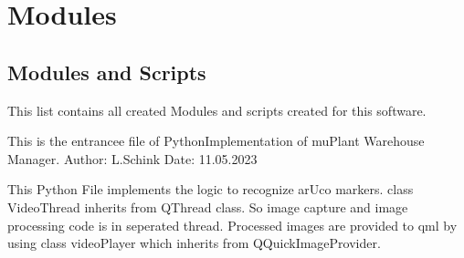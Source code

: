 \documentclass[letterpaper,10pt,english]{sphinxmanual}
\begin{document}
\section{Modules}
\label{\detokenize{index:modules}}
\sphinxstepscope


\subsection{Modules and Scripts}
\label{\detokenize{modules:modules-and-scripts}}\label{\detokenize{modules::doc}}
\sphinxAtStartPar
This list contains all created Modules and scripts created for this software.

\label{\detokenize{modules:module-main}}
\sphinxAtStartPar
This is the entrancee file of Python\sphinxhyphen{}Implementation of muPlant Warehouse Manager.
Author: L.Schink
Date: 11.05.2023

\label{\detokenize{modules:module-src.cameraApplication.cameraProcessing}}
\sphinxAtStartPar
This Python File implements the logic to recognize arUco markers.
class VideoThread inherits from QThread class. So image capture and image processing code is in seperated thread.
Processed images are provided to qml by using class videoPlayer which inherits from QQuickImageProvider.
\end{document}
